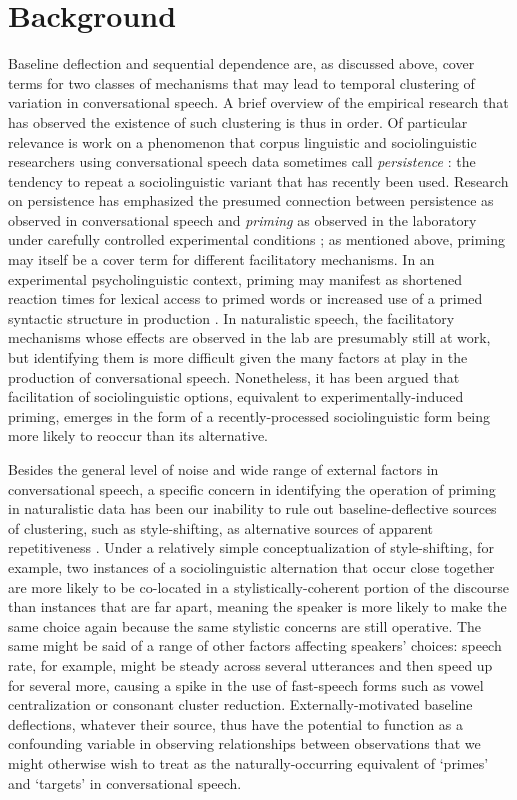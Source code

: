 \documentclass[12pt]{article}
\begin{document}
\section{Background} \label{background}

Baseline deflection and sequential dependence are, as discussed above, cover terms for two classes of mechanisms that may lead to temporal clustering of variation in conversational speech. A brief overview of the empirical research that has observed the existence of such clustering is thus in order.
Of particular relevance is work on a phenomenon that corpus linguistic and sociolinguistic researchers using conversational speech data  sometimes call \emph{persistence} \citep{Szmrecsanyi:2006}: the tendency to repeat a sociolinguistic variant that has recently been used. Research on persistence has emphasized the presumed connection between persistence as observed in conversational speech and \emph{priming} as observed in the laboratory under carefully controlled experimental conditions \citep{Cameron:2004,Gries:2005,Szmrecsanyi:2006,Tamminga:2014b}; as mentioned above, priming may itself be a cover term for different facilitatory mechanisms.
In an experimental psycholinguistic context, priming may manifest as shortened reaction times for lexical access to primed words \citep{Goldinger:1996} or increased use of a primed syntactic structure in production \citep{Pickering:2008}. In naturalistic speech, the facilitatory mechanisms whose effects are observed in the lab are presumably still at work, but identifying them is more difficult given the many factors at play in the production of conversational speech. Nonetheless, it has been argued that facilitation of sociolinguistic options, equivalent to experimentally-induced priming, emerges in the form of a recently-processed sociolinguistic form being more likely to reoccur than its alternative.

Besides the general level of noise and wide range of external factors in conversational speech, a specific concern in identifying the operation of priming in naturalistic data has been our inability to rule out baseline-deflective sources of clustering, such as style-shifting, as alternative sources of apparent repetitiveness \citep{Szmrecsanyi:2006}. Under a relatively simple conceptualization of style-shifting, for example, two instances of a sociolinguistic alternation that occur close together are more likely to be co-located in a stylistically-coherent portion of the discourse than instances that are far apart, meaning the speaker is more likely to make the same choice again because the same stylistic concerns are still operative. The same might be said of a range of other factors affecting speakers' choices: speech rate, for example, might be steady across several utterances and then speed up for several more, causing a  spike in the use of fast-speech forms such as vowel centralization or consonant cluster reduction. Externally-motivated baseline deflections, whatever their source, thus have the potential to function as a confounding variable in observing relationships between observations that we might otherwise wish to treat as the naturally-occurring equivalent of `primes' and `targets' in conversational speech.
\end{document}
